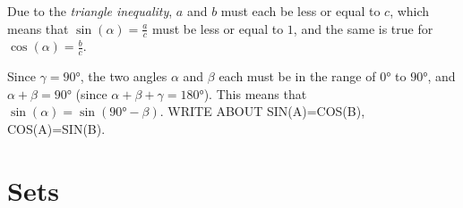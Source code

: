 Due to the \emph{triangle inequality}, $a$ and $b$ must each be less or equal to $c$, which means that $\sin(\alpha)=\frac{a}{c}$ must be less or equal to $1$, and the same is true for $\cos(\alpha)=\frac{b}{c}$.

\begin{note}{}{}
	Since $\gamma=\ang{90}$, the two angles $\alpha$ and $\beta$ each must be in the range of $\ang{0}$ to $\ang{90}$, and $\alpha+\beta=\ang{90}$ (since $\alpha+\beta+\gamma=\ang{180}$). This means that $\sin(\alpha)=\sin(\ang{90}-\beta)$. WRITE ABOUT SIN(A)=COS(B), COS(A)=SIN(B).
\end{note}

\section{Sets}
